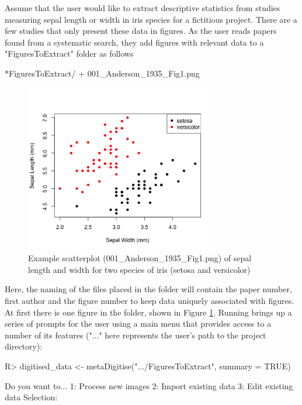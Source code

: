 \documentclass[article]{jss}
\newcommand{\fct}[1]{\code{#1()}}
\begin{document}
Assume that the user would like to extract descriptive statistics from studies measuring sepal length or width in iris species for a fictitious project. There are a few studies that only present these data in figures. As the user reads papers found from a systematic search, they add figures with relevant data to a "FiguresToExtract" folder as follows

\begin{CodeChunk}
\begin{CodeOutput}
*FiguresToExtract/
    + 001_Anderson_1935_Fig1.png
\end{CodeOutput}
\end{CodeChunk}

\begin{figure}[!h]
\centering
 \includegraphics[width=0.75\textwidth]{001_Anderson_1935_Fig1.png} 
 \caption{Example scatterplot (001\_Anderson\_1935\_Fig1.png) of sepal length and width for two species of iris (setosa and versicolor)}
\label{fig:Anderson}
\end{figure}

Here, the naming of the files placed in the folder will contain the paper number, first author and the figure number to keep data uniquely associated with figures. At first there is one figure in the folder, shown in Figure \ref{fig:Anderson}. Running \fct{metaDigitise} brings up a series of prompts for the user using a main menu that provides access to a number of its features ("..." here represents the user's path to the project directory): 

\begin{CodeChunk}
\begin{CodeInput}
R> digitised_data <- metaDigitise(".../FiguresToExtract", summary = TRUE)
\end{CodeInput}
\begin{CodeOutput}
	Do you want to...
1: Process new images
2: Import existing data
3: Edit existing data
Selection: 
\end{CodeOutput}
\end{CodeChunk}
\end{document}
